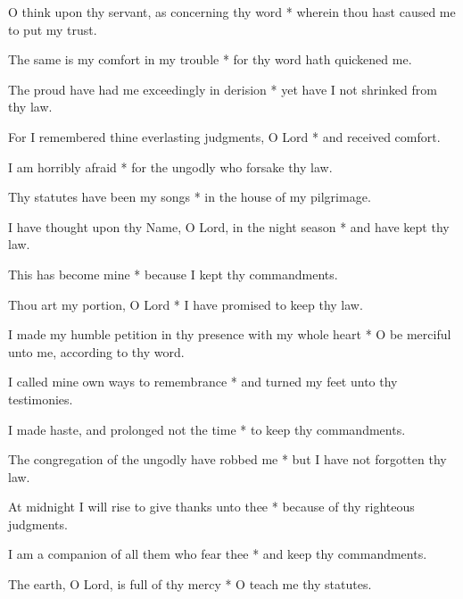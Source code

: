 O think upon thy servant, as concerning thy word * wherein thou hast caused me to put my trust.

The same is my comfort in my trouble * for thy word hath quickened me.

The proud have had me exceedingly in derision * yet have I not shrinked from thy law.

For I remembered thine everlasting judgments, O Lord * and received comfort.

I am horribly afraid * for the ungodly who forsake thy law.

Thy statutes have been my songs * in the house of my pilgrimage.

I have thought upon thy Name, O Lord, in the night season * and have kept thy law.

This has become mine * because I kept thy commandments.

Thou art my portion, O Lord * I have promised to keep thy law.

I made my humble petition in thy presence with my whole heart * O be merciful unto me, according to thy word.

I called mine own ways to remembrance * and turned my feet unto thy testimonies.

I made haste, and prolonged not the time * to keep thy commandments.

The congregation of the ungodly have robbed me * but I have not forgotten thy law.

At midnight I will rise to give thanks unto thee * because of thy righteous judgments.

I am a companion of all them who fear thee * and keep thy commandments.

The earth, O Lord, is full of thy mercy * O teach me thy statutes.